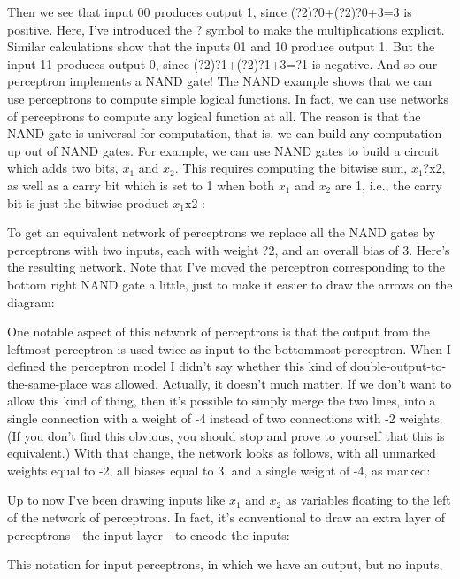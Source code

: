 Then we see that input 00 produces output 1, since (?2)?0+(?2)?0+3=3 is positive. Here, I've introduced the ? symbol to make the multiplications explicit. Similar calculations show that the inputs 01 and 10 produce output 1. But the input 11 produces output 0, since (?2)?1+(?2)?1+3=?1 is negative. And so our perceptron implements a NAND gate!
The NAND example shows that we can use perceptrons to compute simple logical functions. In fact, we can use networks of perceptrons to compute any logical function at all. The reason is that the NAND gate is universal for computation, that is, we can build any computation up out of NAND gates. For example, we can use NAND gates to build a circuit which adds two bits, $x_1$ and $x_2$. This requires computing the bitwise sum, $x_1$?x2, as well as a carry bit which is set to 1 when both $x_1$ and $x_2$ are 1, i.e., the carry bit is just the bitwise product $x_1$x2
: 

To get an equivalent network of perceptrons we replace all the NAND gates by perceptrons with two inputs, each with weight ?2, and an overall bias of 3. Here's the resulting network. Note that I've moved the perceptron corresponding to the bottom right NAND gate a little, just to make it easier to draw the arrows on the diagram: 

One notable aspect of this network of perceptrons is that the output from the leftmost perceptron is used twice as input to the bottommost perceptron. When I defined the perceptron model I didn't say whether this kind of double-output-to-the-same-place was allowed. Actually, it doesn't much matter. If we don't want to allow this kind of thing, then it's possible to simply merge the two lines, into a single connection with a weight of -4 instead of two connections with -2 weights. (If you don't find this obvious, you should stop and prove to yourself that this is equivalent.) With that change, the network looks as follows, with all unmarked weights equal to -2, all biases equal to 3, and a single weight of -4, as marked: 

Up to now I've been drawing inputs like $x_1$ and $x_2$ as variables floating to the left of the network of perceptrons. In fact, it's conventional to draw an extra layer of perceptrons - the input layer - to encode the inputs: 

This notation for input perceptrons, in which we have an output, but no inputs, 

